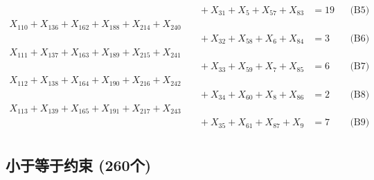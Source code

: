 \documentclass[a4paper,10pt]{article}
\begin{document}
{\begin{align}
&\quad  + X_{31} + X_{5} + X_{57} + X_{83} &= 19 && \text{(B5)} \\
X_{110} + X_{136} + X_{162} + X_{188} + X_{214} + X_{240} \\[0.5ex]
&\quad  + X_{32} + X_{58} + X_{6} + X_{84} &= 3 && \text{(B6)} \\
X_{111} + X_{137} + X_{163} + X_{189} + X_{215} + X_{241} \\[0.5ex]
&\quad  + X_{33} + X_{59} + X_{7} + X_{85} &= 6 && \text{(B7)} \\
X_{112} + X_{138} + X_{164} + X_{190} + X_{216} + X_{242} \\[0.5ex]
&\quad  + X_{34} + X_{60} + X_{8} + X_{86} &= 2 && \text{(B8)} \\
X_{113} + X_{139} + X_{165} + X_{191} + X_{217} + X_{243} \\[0.5ex]
&\quad  + X_{35} + X_{61} + X_{87} + X_{9} &= 7 && \text{(B9)} \\
\end{align}}

\subsection{小于等于约束 (260个)}
\end{document}
